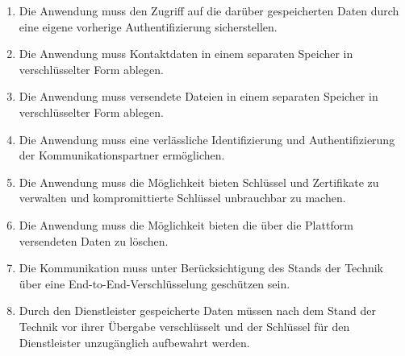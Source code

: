 
    \begin{enumerate}[label={(\arabic*)}]
        \item Die Anwendung muss den Zugriff auf die darüber gespeicherten Daten durch eine eigene vorherige Authentifizierung sicherstellen.
        \item Die Anwendung muss Kontaktdaten in einem separaten Speicher in verschlüsselter Form ablegen.
        \item Die Anwendung muss versendete Dateien in einem separaten Speicher in verschlüsselter Form ablegen.
        \item Die Anwendung muss eine verlässliche Identifizierung und Authentifizierung der Kommunikationspartner ermöglichen.
        \item Die Anwendung muss die Möglichkeit bieten Schlüssel und Zertifikate zu verwalten und kompromittierte Schlüssel unbrauchbar zu machen.
        \item Die Anwendung muss die Möglichkeit bieten die über die Plattform versendeten Daten zu löschen.
        \item Die Kommunikation muss unter Berücksichtigung des Stands der Technik über eine End-to-End-Verschlüsselung geschützen sein.
        \item Durch den Dienstleister gespeicherte Daten müssen nach dem Stand der Technik vor ihrer Übergabe verschlüsselt und der Schlüssel für den Dienstleister unzugänglich aufbewahrt werden.
    \end{enumerate}

